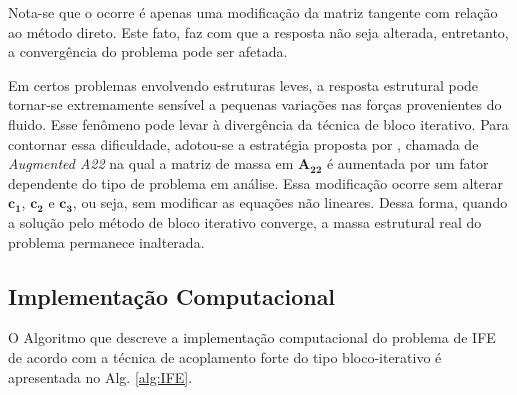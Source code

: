 \documentclass[tese_patricia]{subfiles}
\begin{document}
Nota-se que o ocorre é apenas uma modificação da matriz tangente com relação ao método direto. Este fato, faz com que a resposta não seja alterada, entretanto, a convergência do problema pode ser afetada. 

Em certos problemas envolvendo estruturas leves, a resposta estrutural pode tornar-se extremamente sensível a pequenas variações nas forças provenientes do fluido. Esse fenômeno pode levar à divergência da técnica de bloco iterativo. Para contornar essa dificuldade, adotou-se a estratégia proposta por , chamada de \textit{Augmented A22} na qual a matriz de massa em $\mathbf{A_{22}}$ é aumentada por um fator dependente do tipo de problema em análise. Essa modificação ocorre sem alterar $\mathbf{c_{1}}$, $\mathbf{c_{2}}$ e $\mathbf{c_{3}}$, ou seja, sem modificar as equações não lineares. Dessa forma, quando a solução pelo método de bloco iterativo converge, a massa estrutural real do problema permanece inalterada.

\subsection{Implementação Computacional} 


O Algoritmo que descreve a implementação computacional do problema de IFE de acordo com a técnica de acoplamento forte do tipo bloco-iterativo é apresentada no Alg. \ref{alg:IFE}.
\end{document}
